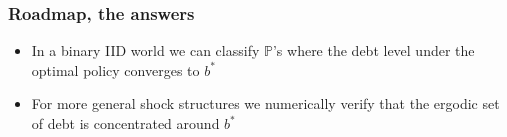 \documentclass{beamer}
\newcommand{\EE}{\mathbb E}
\begin{document}
\begin{frame}
\frametitle{Roadmap, the answers}


	
	\begin{itemize}
	 \item In a binary IID world we can classify $\mathbb{P}$'s where the debt level under the optimal policy converges to $b^*$	 
	 
	\item For more general shock structures we numerically verify that the ergodic set of debt is concentrated around $b^*$
	\end{itemize}

	
\end{frame}
% 
% 
% 
% 
\end{document}
